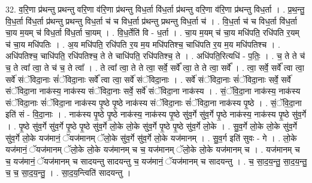 \documentclass[17pt]{extarticle}
\begin{document}
32. व॒रि॒णा प्र॑थन्तु प्रथन्तु वरि॒णा व॑रि॒णा प्र॑थन्तु विध॒र्ता वि॑ध॒र्ता प्र॑थन्तु वरि॒णा व॑रि॒णा 
प्र॑थन्तु विध॒र्ता । . प्र॒थ॒न्तु॒ वि॒ध॒र्ता वि॑ध॒र्ता प्र॑थन्तु प्रथन्तु विध॒र्ता च॑ च विध॒र्ता प्र॑थन्तु प्रथन्तु विध॒र्ता च॑ । . वि॒ध॒र्ता च॑ च विध॒र्ता वि॑ध॒र्ता चा॒य म॒यम् च॑ विध॒र्ता वि॑ध॒र्ता चा॒यम् । . वि॒ध॒र्तेति॑ वि - ध॒र्ता । . चा॒य म॒यम् च॑ चा॒य मधि॑पति॒ रधि॑पति र॒यम् च॑ चा॒य मधि॑पतिः । . अ॒य मधि॑पति॒ रधि॑पति र॒य म॒य मधि॑पतिश्च॒ चाधि॑पति र॒य म॒य मधि॑पतिश्च । . अधि॑पतिश्च॒ चाधि॑पति॒ रधि॑पतिश्च॒ ते ते चाधि॑पति॒ रधि॑पतिश्च॒ ते । . अधि॑पति॒रित्यधि॑ - प॒तिः॒ । . च॒ ते ते च॑ च॒ ते त्वा᳚ त्वा॒ ते च॑ च॒ ते त्वा᳚ । . ते त्वा᳚ त्वा॒ ते ते त्वा॒ सर्वे॒ सर्वे᳚ त्वा॒ ते ते त्वा॒ सर्वे᳚ । . त्वा॒ सर्वे॒ सर्वे᳚ त्वा त्वा॒ सर्वे॑ संॅविदा॒नाः सं॑ॅविदा॒नाः सर्वे᳚ त्वा त्वा॒ सर्वे॑ संॅविदा॒नाः । . सर्वे॑ संॅविदा॒नाः सं॑ॅविदा॒नाः सर्वे॒ सर्वे॑ संॅविदा॒ना नाक॑स्य॒ नाक॑स्य संॅविदा॒नाः सर्वे॒ सर्वे॑ संॅविदा॒ना नाक॑स्य । . सं॒ॅवि॒दा॒ना नाक॑स्य॒ नाक॑स्य संॅविदा॒नाः सं॑ॅविदा॒ना नाक॑स्य पृ॒ष्ठे पृ॒ष्ठे नाक॑स्य संॅविदा॒नाः सं॑ॅविदा॒ना नाक॑स्य पृ॒ष्ठे । . सं॒ॅवि॒दा॒ना इति॑ सं - वि॒दा॒नाः । . नाक॑स्य पृ॒ष्ठे पृ॒ष्ठे नाक॑स्य॒ नाक॑स्य पृ॒ष्ठे सु॑व॒र्गे सु॑व॒र्गे पृ॒ष्ठे नाक॑स्य॒ नाक॑स्य पृ॒ष्ठे सु॑व॒र्गे । . पृ॒ष्ठे सु॑व॒र्गे सु॑व॒र्गे पृ॒ष्ठे पृ॒ष्ठे सु॑व॒र्गे लो॒के लो॒के सु॑व॒र्गे पृ॒ष्ठे पृ॒ष्ठे सु॑व॒र्गे लो॒के । . सु॒व॒र्गे लो॒के लो॒के सु॑व॒र्गे सु॑व॒र्गे लो॒के यज॑मानं॒ ॅयज॑मानम् ॅलो॒के सु॑व॒र्गे सु॑व॒र्गे लो॒के यज॑मानम् । . सु॒व॒र्ग इति॑ सुवः - गे । . लो॒के यज॑मानं॒ ॅयज॑मानम् ॅलो॒के लो॒के यज॑मानम् च च॒ यज॑मानम् ॅलो॒के लो॒के यज॑मानम् च । . यज॑मानम् च च॒ यज॑मानं॒ ॅयज॑मानम् च सादयन्तु सादयन्तु च॒ यज॑मानं॒ ॅयज॑मानम् च सादयन्तु । . च॒ सा॒द॒य॒न्तु॒ सा॒द॒य॒न्तु॒ च॒ च॒ सा॒द॒य॒न्तु॒ । . सा॒द॒य॒न्त्विति॑ सादयन्तु । \newline
\pagebreak
{}
\end{document}
